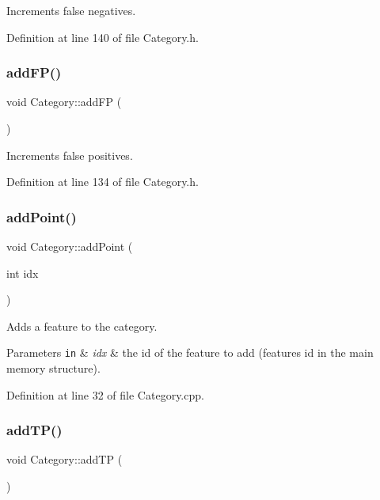Increments false negatives. 

Definition at line 140 of file Category.\+h.

\mbox{\label{class_category_a8ed7b1ffad6f82547b8d1fd68a1926f7}} 
\subsubsection{\texorpdfstring{add\+F\+P()}{addFP()}}
{\footnotesize\ttfamily void Category\+::add\+FP (\begin{DoxyParamCaption}{ }\end{DoxyParamCaption})\hspace{0.3cm}{\ttfamily [inline]}}

Increments false positives. 

Definition at line 134 of file Category.\+h.

\mbox{\label{class_category_a30dcc955d24ac3a6cfd2b37adbac5e14}} 
\subsubsection{\texorpdfstring{add\+Point()}{addPoint()}}
{\footnotesize\ttfamily void Category\+::add\+Point (\begin{DoxyParamCaption}\item[{int}]{idx }\end{DoxyParamCaption})}

Adds a feature to the category.


\begin{DoxyParams}[1]{Parameters}
\mbox{\tt in}  & {\em idx} & the id of the feature to add (features\textquotesingle{} id in the main memory structure). \\
\hline
\end{DoxyParams}


Definition at line 32 of file Category.\+cpp.

\mbox{\label{class_category_afb7ad18835edec07acf3c6129204f63d}} 
\subsubsection{\texorpdfstring{add\+T\+P()}{addTP()}}
{\footnotesize\ttfamily void Category\+::add\+TP (\begin{DoxyParamCaption}{ }\end{DoxyParamCaption})\hspace{0.3cm}{\ttfamily [inline]}}

